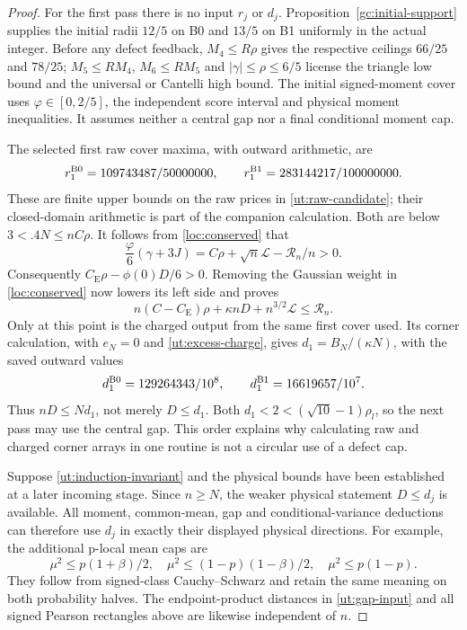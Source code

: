 \documentclass[aop,preprint]{imsart}
\theoremstyle{definition}
\newcommand{\CE}{C_{\mathrm E}}
\numberwithin{equation}{section}
\begin{document}
\begin{proof}
For the first pass there is no input $r_j$ or $d_j$.
Proposition~\ref{gc:initial-support} supplies the initial radii
$12/5$ on B0 and $13/5$ on B1 uniformly in the actual integer.
Before any defect feedback,
$M_4\le R\rho$ gives the respective ceilings $66/25$ and $78/25$;
$M_5\le RM_4$, $M_6\le RM_5$ and $|\gamma|\le\rho\le6/5$
license the triangle low bound and the universal or Cantelli high
bound. The initial signed-moment cover uses $\varphi\in[0,2/5]$,
the independent score interval and physical moment inequalities.
It assumes neither a central gap nor a final conditional moment cap.

The selected first raw cover maxima, with outward arithmetic, are
\[
 r_1^{\rm B0}=109743487/50000000,
 \qquad r_1^{\rm B1}=283144217/100000000.
\]
These are finite upper bounds on the raw prices in
\eqref{ut:raw-candidate}; their closed-domain arithmetic is part of
the companion calculation. Both are below $3<.4N\le nC\rho$.
It follows from \eqref{loc:conserved} that
\[
 \frac{\varphi}{6}(\gamma+3J)
            =C\rho+\sqrt n\mathcal L-\mathcal R_n/n>0.
\]
Consequently $\CE\rho-\phi(0)D/6>0$. Removing the Gaussian weight
in \eqref{loc:conserved} now lowers its left side and proves
\begin{equation}\label{ut:bootstrap}
 n(C-\CE)\rho+\kappa nD+n^{3/2}\mathcal L\le\mathcal R_n.
\end{equation}
Only at this point is the charged output from the same first cover
used. Its corner calculation, with $e_N=0$ and
\eqref{ut:excess-charge}, gives
$d_1=B_N/(\kappa N)$, with the saved outward values
\[
 d_1^{\rm B0}=129264343/10^8,\qquad
 d_1^{\rm B1}=16619657/10^7.
\]
Thus $nD\le Nd_1$, not merely $D\le d_1$.
Both $d_1<2< (\sqrt{10}-1)\rho_l$, so the next pass may use the
central gap. This order explains why calculating raw and charged
corner arrays in one routine is not a circular use of a defect cap.

Suppose \eqref{ut:induction-invariant} and the physical bounds have
been established at a later incoming stage. Since $n\ge N$, the
weaker physical statement $D\le d_j$ is available. All moment,
common-mean, gap and conditional-variance deductions can therefore
use $d_j$ in exactly their displayed physical directions.
For example, the additional p-local mean caps are
\[
 \mu^2\le p(1+\beta)/2,\quad
 \mu^2\le(1-p)(1-\beta)/2,\quad \mu^2\le p(1-p).
\]
They follow from signed-class Cauchy--Schwarz and retain the same
meaning on both probability halves. The endpoint-product distances
in \eqref{ut:gap-input} and all signed Pearson rectangles above
are likewise independent of $n$.


\end{proof}
\end{document}
